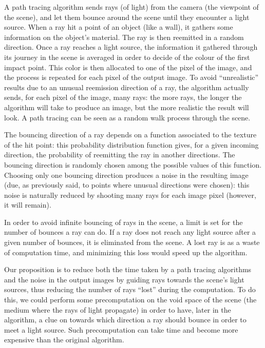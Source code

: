 \documentclass[final,envcountsame]{llncs}
\def\quotes#1{``#1''}
\begin{document}
A path tracing algorithm sends rays (of light) from the camera (the viewpoint of the scene), and let them bounce around the scene until they encounter a light source. When a ray hit a point of an object (like a wall), it gathers some information on the object's material. The ray is then reemitted in a random direction. Once a ray reaches a light source, the information it gathered through its journey in the scene is averaged in order to decide of the colour of the first impact point. This color is then allocated to one of the pixel of the image, and the process is repeated for each pixel of the output image. To avoid \quotes{unrealistic} results due to an unusual reemission direction of a ray, the algorithm actually sends, for each pixel of the image, many rays: the more rays, the longer the algorithm will take to produce an image, but the more realistic the result will look. A path tracing can be seen as a random walk process through the scene.

The bouncing direction of a ray depends on a function associated to the texture of the hit point: this probability distribution function gives, for a given incoming direction, the probability of reemitting the ray in another directions. The bouncing direction is randomly chosen among the possible values of this function. Choosing only one bouncing direction produces a noise in the resulting image (due, as previously said, to points where unusual directions were chosen): this noise is naturally reduced by shooting many rays for each image pixel (however, it will remain). 

In order to avoid infinite bouncing of rays in the scene, a limit is set for the number of bounces a ray can do. If a ray does not reach any light source after a given number of bounces, it is eliminated from the scene. A lost ray is as a waste of computation time, and minimizing this loss would speed up the algorithm.

Our proposition is to reduce both the time taken by a path tracing algorithms and the noise in the output images by guiding rays towards the scene's light sources, thus reducing the number of rays \quotes{lost} during the computation. To do this, we could perform some precomputation on the void space of the scene (the medium where the rays of light propagate) in order to have, later in the algorithm, a clue on towards which direction a ray should bounce in order to meet a light source. Such precomputation can take time and become more expensive than the original algorithm.
\end{document}
